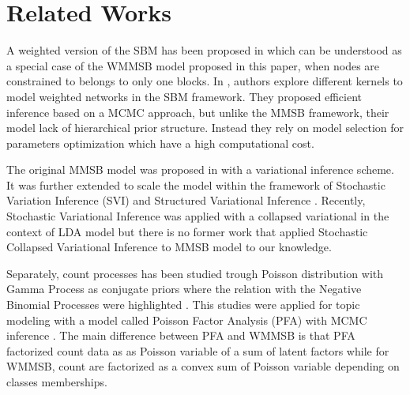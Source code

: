 \section{Related Works}



A weighted version of the SBM has been proposed in \cite{aicher2014learning} which can be understood as a special case of the WMMSB model proposed in this paper, when nodes are constrained to belongs to only one blocks. In \cite{peixoto2018nonparametric}, authors explore different kernels to model weighted networks in the SBM framework. They proposed efficient inference based on a MCMC approach, but unlike the MMSB framework, their model lack of hierarchical prior structure. Instead they rely on model selection for parameters optimization which have a high computational cost.

The original MMSB model was proposed in \cite{airoldi2009mixed} with a variational inference scheme. It was further extended to scale the model within the framework of Stochastic Variation Inference (SVI) \cite{gopalan2013efficient} and Structured Variational Inference \cite{kim2013efficient}. Recently, Stochastic Variational Inference was applied with a collapsed variational in the context of LDA model \cite{foulds2013stochastic} but there is no former work that applied Stochastic Collapsed Variational Inference to MMSB model to our knowledge.

Separately, count processes has been studied trough Poisson distribution with Gamma Process as conjugate priors where the relation with the Negative Binomial Processes were highlighted \cite{zhou2012augment} \cite{zhou2015negative}. This studies were applied for topic modeling with a model called Poisson Factor Analysis (PFA) with MCMC inference \cite{zhou2012beta}. The main difference between PFA and WMMSB is that PFA factorized count data as as  Poisson variable of a sum of latent factors while for WMMSB, count are  factorized as a convex sum of Poisson variable depending on classes memberships.




